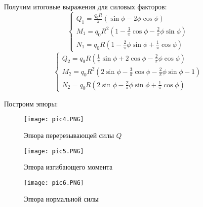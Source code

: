 Получим итоговые выражения для силовых факторов:
\begin{equation}
    \label{eq50}
    \begin{cases}
        \displaystyle Q_1 = \frac{q_0R}{\pi}(\sin \phi - 2\phi \cos \phi)
        \\[10pt]
        \displaystyle M_1 = q_0R^2(1 - \frac{3}{\pi} \cos \phi - \frac{2}{\pi} \phi \sin \phi)
        \\[10pt]
        \displaystyle N_1 = q_0R(1 - \frac{2}{\pi} \phi \sin \phi + \frac{1}{\pi} \cos \phi)
    \end{cases}
\end{equation}
\begin{equation}
    \label{eq51}
    \begin{cases}
        \displaystyle Q_2 = q_0R (\frac{1}{\pi} \sin \phi + 2\cos \phi - \frac{2}{\pi} \phi \cos \phi)
        \\[10pt]
        \displaystyle M_2 = q_0R^2 (2 \sin \phi - \frac{3}{\pi} \cos \phi - \frac{2}{\pi}\phi \sin \phi - 1)
        \\[10pt]
        \displaystyle N_2 = q_0R (2\sin \phi - \frac{2}{\pi} \phi \sin \phi + \frac{1}{\pi}\cos \phi)
    \end{cases}
\end{equation}

Построим эпюры:
\begin{figure}[H]
    \begin{center}
        \texttt{[image: pic4.PNG]}
        \caption{Эпюра перерезывающей силы $Q$}
        \label{pic4}
    \end{center}
\end{figure}
\begin{figure}[H]
    \begin{center}
        \texttt{[image: pic5.PNG]}
        \caption{Эпюра изгибающего момента}
        \label{pic5}
    \end{center}
\end{figure}
\begin{figure}[H]
    \begin{center}
        \texttt{[image: pic6.PNG]}
        \caption{Эпюра нормальной силы}
        \label{pic6}
    \end{center}
\end{figure}